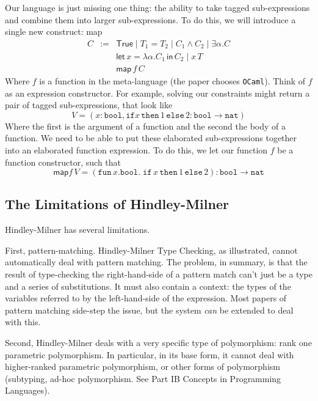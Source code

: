 {Our language is just missing one thing: the ability to take tagged sub-expressions and combine them into larger sub-expressions. To do this, we will introduce a single new construct: \textsf{map}
\[\begin{array}{lcl}
     C&:=&\textsf{True} \mid T_1 = T_2 \mid C_1 \land C_2 \mid \exists \alpha . C \\
        &&\textsf{let}\, x = \lambda \alpha . C_1 \, \textsf{in} \, C_2 \mid x \, T\\
        &&\textsf{map} \, f \, C
     \end{array}
\]
Where $f$ is a function in the meta-language (the paper chooses \texttt{OCaml}). Think of $f$ as an expression constructor. For example, solving our constraints might return a pair of tagged sub-expressions, that look like
\[V = (x: \texttt{bool}, \texttt{if} x \, \texttt{then} \, 1 \, \texttt{else} \, 2: \texttt{bool} \rightarrow \texttt{nat})\]
Where the first is the argument of a function and the second the body of a function. We need to be able to put these elaborated sub-expressions together into an elaborated function expression. To do this, we let our function $f$ be a function constructor, such that
\[\textsf{map} f \, V = (\texttt{fun} \, x. \texttt{bool}.\; \texttt{if} \,  x \, \texttt{then} \, 1 \, \texttt{else} \, 2): \texttt{bool} \rightarrow \texttt{nat}\]

\subsection{The Limitations of Hindley-Milner}
Hindley-Milner has several limitations. 

First, pattern-matching. Hindley-Milner Type Checking, as illustrated, cannot automatically deal with pattern matching. The problem, in summary, is that the result of type-checking the right-hand-side of a pattern match can't just be a type and a series of substitutions. It must also contain a context: the types of the variables referred to by the left-hand-side of the expression. Most papers of pattern matching side-step the issue, but the system \textit{can} be extended to deal with this.

Second, Hindley-Milner deals with a very specific type of polymorphism: rank one parametric polymorphism. In particular, in its base form, it cannot deal with higher-ranked parametric polymorphism, or other forms of polymorphism (subtyping, ad-hoc polymorphism. See \textsf{Part IB Concepts in Programming Languages}).

}

